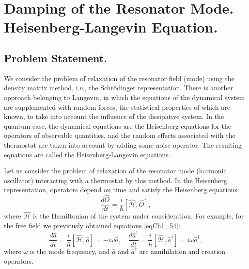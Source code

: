 \section{Damping of the Resonator Mode. Heisenberg-Langevin Equation.}

\subsection{Problem Statement.}
We consider the problem of relaxation of the resonator field (mode) using the density matrix method, i.e., the Schrödinger representation. There is another approach belonging to Langevin, in which the equations of the dynamical system are supplemented with random forces, the statistical properties of which are known, to take into account the influence of the dissipative system. In the quantum case, the dynamical equations are the Heisenberg equations for the operators of observable quantities, and the random effects associated with the thermostat are taken into account by adding some noise operator. The resulting equations are called the Heisenberg-Langevin equations.

Let us consider the problem of relaxation of the resonator mode (harmonic oscillator) interacting with a thermostat by this method. In the Heisenberg representation, operators depend on time and satisfy the Heisenberg equations:
\begin{equation}
\frac{d \hat{O}}{dt} = \frac{i}{\hbar}
\left[\hat{\mathcal{H}}, \hat{O}\right],
\nonumber
\end{equation}
where $\hat{\mathcal{H}}$ is the Hamiltonian of the system under consideration. For example, for the free field we previously obtained equations \eqref{eqCh1_54}:
\begin{equation}
\frac{d \hat{a}}{d t} = \frac{i}{\hbar}\left[\hat{\mathcal{H}},
  \hat{a}\right] = -i \omega \hat{a}, \quad
\frac{d \hat{a}^{\dag}}{dt} = \frac{i}{\hbar}\left[\hat{\mathcal{H}},
  \hat{a}^{\dag}\right] = i \omega \hat{a}^{\dag},
\nonumber
\end{equation}
where $\omega$ is the mode frequency, and $\hat{a}$ and $\hat{a}^{\dag}$ are annihilation and creation operators.



